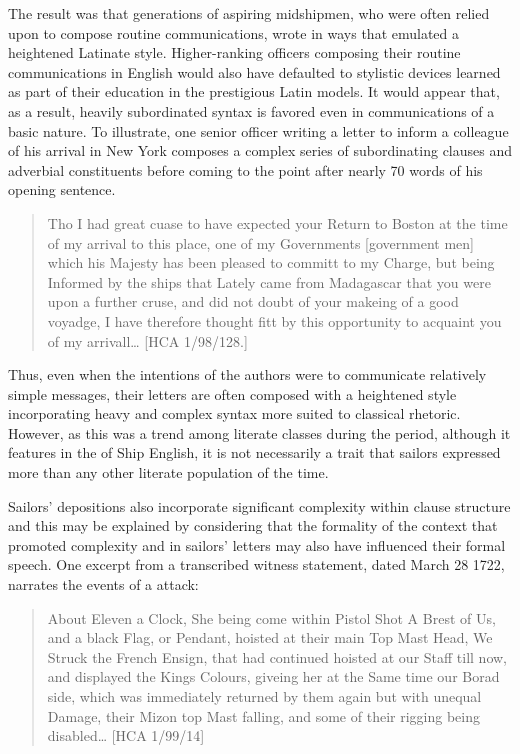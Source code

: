 The result was that generations of aspiring midshipmen, who were often relied upon to compose routine communications, wrote in ways that emulated a heightened Latinate style. Higher-ranking officers composing their routine communications in English would also have defaulted to stylistic devices learned as part of their education in the prestigious Latin models. It would appear that, as a result, heavily subordinated syntax is favored even in communications of a basic nature. To illustrate, one senior officer writing a letter to inform a colleague of his arrival in New York composes a complex series of subordinating clauses and adverbial constituents before coming to the point after nearly 70 words of his opening sentence.

\begin{quotation}
Tho I had great cuase to have expected your Return to Boston at the time of my arrival to this place, one of my Governments [government men] which his Majesty has been pleased to committ to my Charge, but being Informed by the ships that Lately came from Madagascar that you were upon a further cruse, and did not doubt of your makeing of a good voyadge, I have therefore thought fitt by this opportunity to acquaint you of my arrivall… [HCA 1/98/128.]
\end{quotation}

Thus, even when the intentions of the authors were to communicate relatively simple messages, their letters are often composed with a heightened style incorporating heavy  and complex syntax more suited to classical rhetoric. However, as this was a trend among literate classes during the period, although it features in the  of Ship English, it is not necessarily a trait that sailors expressed more than any other literate population of the time. 

Sailors’ depositions also incorporate significant complexity within clause structure and this may be explained by considering that the formality of the context that promoted complexity and  in sailors’ letters may also have influenced their formal speech.  One excerpt from a transcribed witness statement, dated March 28 1722, narrates the events of a  attack:

\begin{quotation}
About Eleven a Clock, She being come within Pistol Shot A Brest of Us, and a black Flag, or Pendant, hoisted at their main Top Mast Head, We Struck the French Ensign, that had continued hoisted at our Staff till now, and displayed the Kings Colours, giveing her at the Same time our Borad side, which was immediately returned by them again but with unequal Damage, their Mizon top Mast falling, and some of their rigging being disabled… [HCA 1/99/14] 
\end{quotation}


